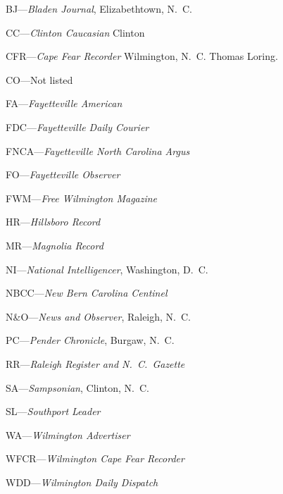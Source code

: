 \documentclass[11pt, a5paper, openright]{book}
\begin{document}
\begin{thebibliography}{99}
  BJ---\emph{Bladen Journal}, Elizabethtown, N.~C.

  CC---\emph{Clinton Caucasian} Clinton

  CFR---\emph{Cape Fear Recorder} Wilmington, N.~C.  Thomas Loring.

  CO---Not listed

  FA---\emph{Fayetteville American}

  FDC---\emph{Fayetteville Daily Courier}

  FNCA---\emph{Fayetteville North Carolina Argus}

  FO---\emph{Fayetteville Observer}

  FWM---\emph{Free Wilmington Magazine}

  HR---\emph{Hillsboro Record}

  MR---\emph{Magnolia Record}

  NI---\emph{National Intelligencer}, Washington, D.~C.

  NBCC---\emph{New Bern Carolina Centinel}

  N\&O---\emph{News and Observer}, Raleigh, N.~C.

  PC---\emph{Pender Chronicle}, Burgaw, N.~C.

  RR---\emph{Raleigh Register and N.~C.~Gazette}

  SA---\emph{Sampsonian}, Clinton, N.~C.

  SL---\emph{Southport Leader}

  WA---\emph{Wilmington Advertiser}

  WFCR---\emph{Wilmington Cape Fear Recorder}

  WDD---\emph{Wilmington Daily Dispatch}


\end{thebibliography}
\end{document}
